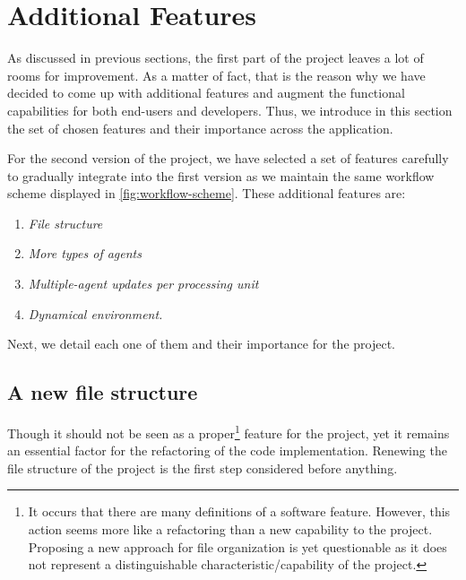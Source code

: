 %
%
%
%

\section{Additional Features}\label{sec:features}
As discussed in previous sections, the first part of the project leaves a lot of rooms for improvement. As a matter of fact, that is the reason why we have decided to come up with additional features and augment the functional capabilities for both end-users and developers. Thus, we introduce in this section the set of chosen features and their importance across the application.

For the second version of the project, we have selected a set of features carefully to gradually integrate into the first version as we maintain the same workflow scheme displayed in \autoref{fig:workflow-scheme}. These additional features are:
\begin{enumerate}
    \item \textit{File structure}
    \item \textit{More types of agents}
    \item \textit{Multiple-agent updates per processing unit}
    \item \textit{Dynamical environment.}
\end{enumerate}

\noindent
Next, we detail each one of them and their importance for the project.

\subsection{A new file structure}
Though it should not be seen as a proper\footnote{It occurs that there are many definitions of a software feature. However, this action seems more like a refactoring than a new capability to the project. Proposing a new approach for file organization is yet questionable as it does not represent a distinguishable characteristic/capability of the project.} feature for the project, yet it remains an essential factor for the refactoring of the code implementation. Renewing the file structure of the project is the first step considered before anything.

